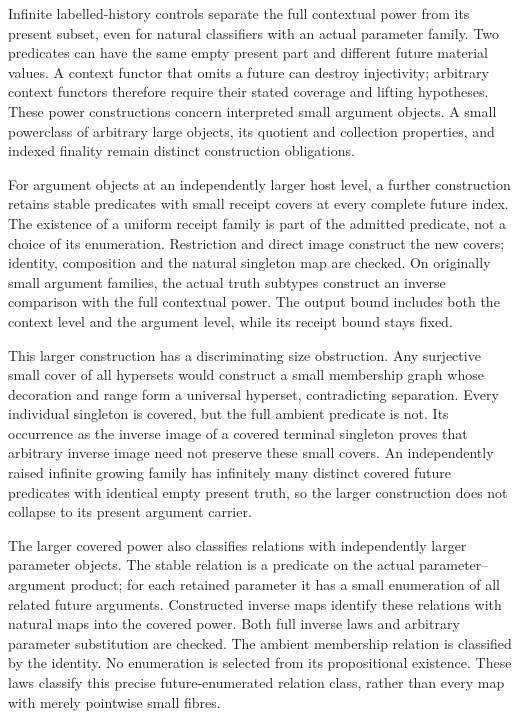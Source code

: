 \documentclass[11pt]{article}
\theoremstyle{definition}
\theoremstyle{remark}
\begin{document}
Infinite labelled-history controls separate the full contextual power
from its present subset, even for natural classifiers with an actual
parameter family.  Two predicates can have the same empty present part
and different future material values.  A context functor that omits a
future can destroy injectivity; arbitrary context functors therefore
require their stated coverage and lifting hypotheses.  These power
constructions concern interpreted small argument objects.  A small
powerclass of arbitrary large objects, its quotient and collection
properties, and indexed finality remain distinct construction obligations.

For argument objects at an independently larger host level, a further
construction retains stable predicates with small receipt covers at every
complete future index.  The existence of a uniform receipt family is part
of the admitted predicate, not a choice of its enumeration.  Restriction
and direct image construct the new covers; identity, composition and the
natural singleton map are checked.  On originally small argument families,
the actual truth subtypes construct an inverse comparison with the full
contextual power.  The output bound includes both the context level and
the argument level, while its receipt bound stays fixed.

This larger construction has a discriminating size obstruction.  Any
surjective small cover of all hypersets would construct a small membership
graph whose decoration and range form a universal hyperset, contradicting
separation.  Every individual singleton is covered, but the full ambient
predicate is not.  Its occurrence as the inverse image of a covered
terminal singleton proves that arbitrary inverse image need not preserve
these small covers.  An independently raised infinite growing family has
infinitely many distinct covered future predicates with identical empty
present truth, so the larger construction does not collapse to its present
argument carrier.

The larger covered power also classifies relations with independently
larger parameter objects.  The stable relation is a predicate on the
actual parameter--argument product; for each retained parameter it has
a small enumeration of all related future arguments.  Constructed
inverse maps identify these relations with natural maps into the covered
power.  Both full inverse laws and arbitrary parameter substitution are
checked.  The ambient membership relation is classified by the identity.
No enumeration is selected from its propositional existence.  These laws
classify this precise future-enumerated relation class, rather than every
map with merely pointwise small fibres.
\end{document}
